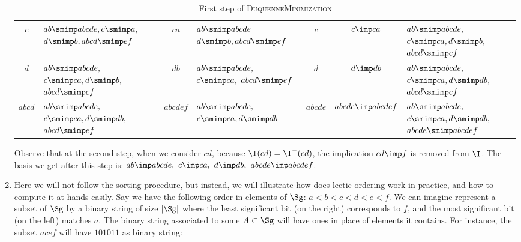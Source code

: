 \begin{enumerate}
\begin{table}[ht]
\begin{tabular}{| c || p{2.7cm} | c | p{2.5cm} | c | c | p{2.7cm} | }
	$c$ & $ab \smimp abcde, c \smimp a,$ \newline $d \smimp b, abcd \smimp ef$ & $ca$ & $ab \smimp abcde$ \newline $d \smimp b, abcd \smimp ef$ & $c$ & 
	$c \imp ca$ & $ab \smimp abcde,$ \newline $c \smimp ca, d \smimp b,$ \newline $abcd \smimp ef$ \\ \hline
	
	$d$ & $ab \smimp abcde,$ \newline $c \smimp ca, d \smimp b,$ \newline $abcd \smimp ef$ & $db$ & $ab \smimp abcde,$ \newline $c \smimp ca,$ \newline $abcd \smimp ef$ & $d$ & $d \imp db$ & $ab \smimp abcde,$ \newline $c \smimp ca, d \smimp db,$ \newline $abcd \smimp ef$ \\ \hline
	
	$abcd$ & $ab \smimp abcde,$ \newline $c \smimp ca, d \smimp db,$ \newline $abcd \smimp ef$ & $abcdef$ & $ab \smimp abcde,$ \newline $c \smimp ca, d \smimp db$ & $abcde$ & $abcde \imp abcdef$ & $ab \smimp abcde,$ \newline $c \smimp ca, d \smimp db,$ \newline $abcde \smimp abcdef$ \\ \hline
		
	\end{tabular}

\caption{First step of \textsc{DuquenneMinimization}}
\label{tab:duq-red}
\end{table}
Observe that at the second step, when we consider $cd$, because $\I(cd) = \I^{-}(cd)$, the implication $cd \imp f$ is removed from $\I$. The basis we get
after this step is: $ab \imp abcde, \ c \imp ca, \ d \imp db,$  $abcde \imp abcdef$.

\item {} Here we will not follow the sorting procedure, but instead, we will illustrate how does lectic ordering work in practice, and how to compute it at hands easily. Say we have the following  order in elements of $\Sg$: $a < b < c < d < e < f$. We can imagine represent
a subset of $\Sg$ by a binary string of size $|\Sg|$ where the least significant bit (on the right) corresponds to $f$, and the most significant bit
(on the left) matches $a$. The binary string associated to some $A \subset \Sg$ will have ones in place of elements it contains. For instance, the subset 
$acef$ will have $101011$ as binary string:


\end{enumerate}
